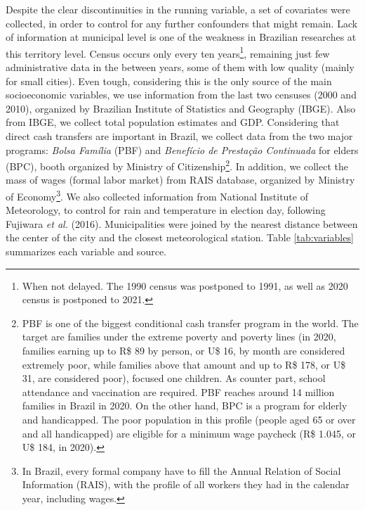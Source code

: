 \documentclass[
  12pt,
]{article}
\begin{document}
Despite the clear discontinuities in the running variable, a set of
covariates were collected, in order to control for any further
confounders that might remain. Lack of information at municipal level is
one of the weakness in Brazilian researches at this territory level.
Census occurs only every ten years\footnote{When not delayed. The 1990
  census was postponed to 1991, as well as 2020 census is postponed to
  2021.}, remaining just few administrative data in the between years,
some of them with low quality (mainly for small cities). Even tough,
considering this is the only source of the main socioeconomic variables,
we use information from the last two censuses (2000 and 2010), organized
by Brazilian Institute of Statistics and Geography (IBGE). Also from
IBGE, we collect total population estimates and GDP. Considering that
direct cash transfers are important in Brazil, we collect data from the
two major programs: \emph{Bolsa Família} (PBF) and \emph{Benefício de
Prestação Continuada} for elders (BPC), booth organized by Ministry of
Citizenship\footnote{PBF is one of the biggest conditional cash transfer
  program in the world. The target are families under the extreme
  poverty and poverty lines (in 2020, families earning up to R\$ 89 by
  person, or U\$ 16, by month are considered extremely poor, while
  families above that amount and up to R\$ 178, or U\$ 31, are
  considered poor), focused one children. As counter part, school
  attendance and vaccination are required. PBF reaches around 14 million
  families in Brazil in 2020. On the other hand, BPC is a program for
  elderly and handicapped. The poor population in this profile (people
  aged 65 or over and all handicapped) are eligible for a minimum wage
  paycheck (R\$ 1.045, or U\$ 184, in 2020).}. In addition, we collect
the mass of wages (formal labor market) from RAIS database, organized by
Ministry of Economy\footnote{In Brazil, every formal company have to
  fill the Annual Relation of Social Information (RAIS), with the
  profile of all workers they had in the calendar year, including wages.}.
We also collected information from National Institute of Meteorology, to
control for rain and temperature in election day, following Fujiwara
\emph{et al.} (2016). Municipalities were joined by the nearest distance
between the center of the city and the closest meteorological station.
Table \ref{tab:variables} summarizes each variable and source.
\end{document}

